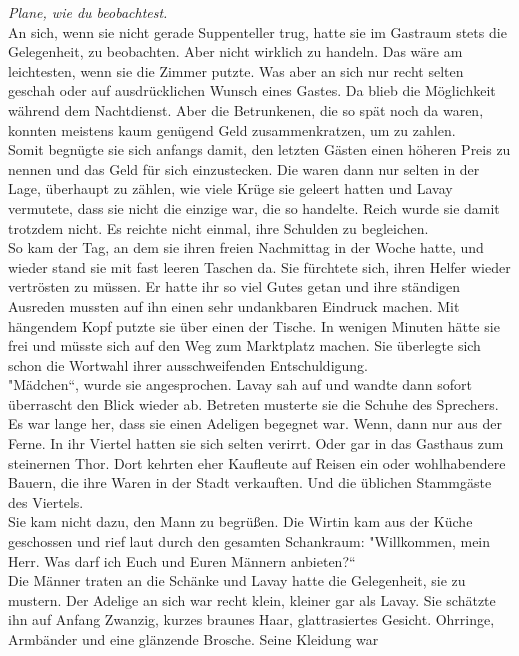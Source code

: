 \textit{Plane, wie du beobachtest.}\\
An sich, wenn sie nicht gerade Suppenteller trug, hatte sie im Gastraum stets die Gelegenheit, zu 
beobachten. Aber nicht wirklich zu handeln. Das wäre am leichtesten, wenn sie die Zimmer putzte. 
Was aber an sich nur recht selten geschah oder auf ausdrücklichen Wunsch eines Gastes. Da blieb die 
Möglichkeit während dem Nachtdienst. Aber die Betrunkenen, die so spät noch da waren, konnten 
meistens kaum genügend Geld zusammenkratzen, um zu zahlen.\\
Somit begnügte sie sich anfangs damit, den letzten Gästen einen höheren Preis zu nennen und das 
Geld für sich einzustecken. Die waren dann nur selten in der Lage, überhaupt zu zählen, wie viele 
Krüge sie geleert hatten und Lavay vermutete, dass sie nicht die einzige war, die so handelte. 
Reich wurde sie damit trotzdem nicht. Es reichte nicht einmal, ihre Schulden zu begleichen.\\
So kam der Tag, an dem sie ihren freien Nachmittag in der Woche hatte, und wieder stand sie mit 
fast leeren Taschen da. Sie fürchtete sich, ihren Helfer wieder vertrösten zu müssen. Er hatte ihr 
so viel Gutes getan und ihre ständigen Ausreden mussten auf ihn einen sehr undankbaren Eindruck 
machen. Mit hängendem Kopf putzte sie über einen der Tische. In wenigen Minuten hätte sie frei und 
müsste sich auf den Weg zum Marktplatz machen. Sie überlegte sich schon die Wortwahl ihrer 
ausschweifenden Entschuldigung.\\
"Mädchen``, wurde sie angesprochen.
Lavay sah auf und wandte dann sofort überrascht den Blick wieder ab. Betreten musterte sie die 
Schuhe des Sprechers. Es war lange her, dass sie einen Adeligen begegnet war. Wenn, dann nur aus 
der Ferne. In ihr Viertel hatten sie sich selten verirrt. Oder gar in das Gasthaus zum steinernen 
Thor. Dort kehrten eher Kaufleute auf Reisen ein oder wohlhabendere Bauern, die ihre Waren in der 
Stadt verkauften. Und die üblichen Stammgäste des Viertels.\\
Sie kam nicht dazu, den Mann zu begrüßen. Die Wirtin kam aus der Küche geschossen und rief laut 
durch den gesamten Schankraum: "Willkommen, mein Herr. Was darf ich Euch und Euren Männern 
anbieten?``\\
Die Männer traten an die Schänke und Lavay hatte die Gelegenheit, sie zu mustern. Der Adelige an 
sich war recht klein, kleiner gar als Lavay. Sie schätzte ihn auf Anfang Zwanzig, kurzes braunes 
Haar, glattrasiertes Gesicht. Ohrringe, Armbänder und eine glänzende Brosche. Seine Kleidung war 
